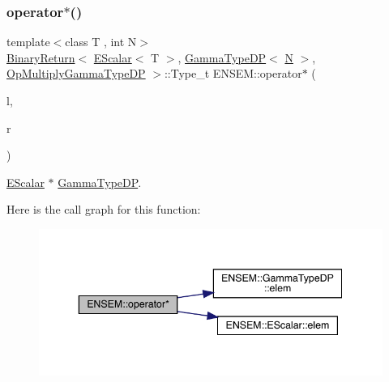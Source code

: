 \subsubsection{\texorpdfstring{operator$\ast$()}{operator*()}\hspace{0.1cm}{\footnotesize\ttfamily [9/9]}}
{\footnotesize\ttfamily template$<$class T , int N$>$ \\
\mbox{\hyperlink{structENSEM_1_1BinaryReturn}{Binary\+Return}}$<$ \mbox{\hyperlink{classENSEM_1_1EScalar}{E\+Scalar}}$<$ T $>$, \mbox{\hyperlink{classENSEM_1_1GammaTypeDP}{Gamma\+Type\+DP}}$<$ \mbox{\hyperlink{operator__name__util_8cc_a7722c8ecbb62d99aee7ce68b1752f337}{N}} $>$, \mbox{\hyperlink{structENSEM_1_1OpMultiplyGammaTypeDP}{Op\+Multiply\+Gamma\+Type\+DP}} $>$\+::Type\+\_\+t E\+N\+S\+E\+M\+::operator$\ast$ (\begin{DoxyParamCaption}\item[{const \mbox{\hyperlink{classENSEM_1_1EScalar}{E\+Scalar}}$<$ T $>$ \&}]{l,  }\item[{const \mbox{\hyperlink{classENSEM_1_1GammaTypeDP}{Gamma\+Type\+DP}}$<$ \mbox{\hyperlink{operator__name__util_8cc_a7722c8ecbb62d99aee7ce68b1752f337}{N}} $>$ \&}]{r }\end{DoxyParamCaption})\hspace{0.3cm}{\ttfamily [inline]}}



\mbox{\hyperlink{classENSEM_1_1EScalar}{E\+Scalar}} $\ast$ \mbox{\hyperlink{classENSEM_1_1GammaTypeDP}{Gamma\+Type\+DP}}. 

Here is the call graph for this function\+:
\nopagebreak
\begin{figure}[H]
\begin{center}
\leavevmode
\includegraphics[width=343pt]{d4/dca/group__escalar_ga546f1e55f2e4eda7a887fbf4fcaa177f_cgraph}
\end{center}
\end{figure}
\mbox{\label{group__escalar_ga45a6583b8f7490b2e54b5c88ff07ba94}} 
